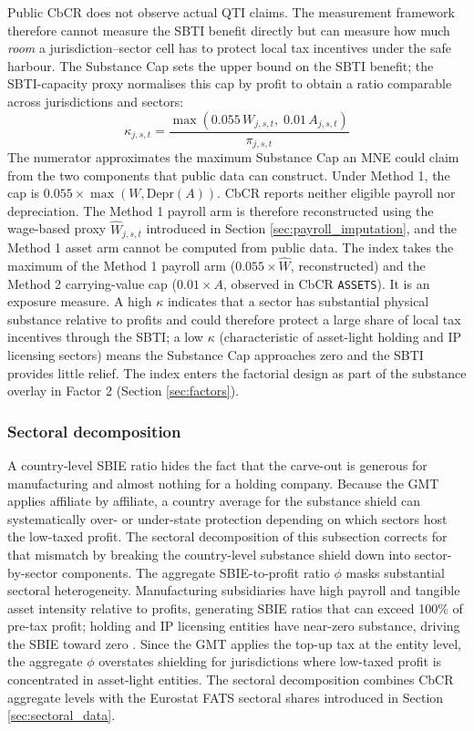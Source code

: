 \documentclass[11pt,a4paper]{article}
\newcommand{\code}[1]{\texttt{#1}}
\begin{document}
Public CbCR does not observe actual QTI claims. The measurement framework therefore cannot measure the SBTI benefit directly but can measure how much \emph{room} a jurisdiction--sector cell has to protect local tax incentives under the safe harbour. The Substance Cap sets the upper bound on the SBTI benefit; the SBTI-capacity proxy normalises this cap by profit to obtain a ratio comparable across jurisdictions and sectors:
\begin{equation}\label{eq:sbti_capacity}
\kappa_{j,s,t} = \frac{\max\!\left(0.055\,W_{j,s,t},\; 0.01\,A_{j,s,t}\right)}{\pi_{j,s,t}}
\end{equation}
The numerator approximates the maximum Substance Cap an MNE could claim from the two components that public data can construct. Under Method 1, the cap is $0.055 \times \max(W, \text{Depr}(A))$. CbCR reports neither eligible payroll nor depreciation. The Method 1 payroll arm is therefore reconstructed using the wage-based proxy $\hat{W}_{j,s,t}$ introduced in Section \ref{sec:payroll_imputation}, and the Method 1 asset arm cannot be computed from public data. The index takes the maximum of the Method 1 payroll arm ($0.055 \times \hat{W}$, reconstructed) and the Method 2 carrying-value cap ($0.01 \times A$, observed in CbCR \code{ASSETS}). It is an exposure measure. A high $\kappa$ indicates that a sector has substantial physical substance relative to profits and could therefore protect a large share of local tax incentives through the SBTI; a low $\kappa$ (characteristic of asset-light holding and IP licensing sectors) means the Substance Cap approaches zero and the SBTI provides little relief. The index enters the factorial design as part of the substance overlay in Factor 2 (Section \ref{sec:factors}).


\subsubsection{Sectoral decomposition}\label{sec:sbie_decomp}

A country-level SBIE ratio hides the fact that the carve-out is generous for manufacturing and almost nothing for a holding company. Because the GMT applies affiliate by affiliate, a country average for the substance shield can systematically over- or under-state protection depending on which sectors host the low-taxed profit. The sectoral decomposition of this subsection corrects for that mismatch by breaking the country-level substance shield down into sector-by-sector components. The aggregate SBIE-to-profit ratio $\phi$ masks substantial sectoral heterogeneity. Manufacturing subsidiaries have high payroll and tangible asset intensity relative to profits, generating SBIE ratios that can exceed 100\% of pre-tax profit; holding and IP licensing entities have near-zero substance, driving the SBIE toward zero \citep{devereux2023}. Since the GMT applies the top-up tax at the entity level, the aggregate $\phi$ overstates shielding for jurisdictions where low-taxed profit is concentrated in asset-light entities. The sectoral decomposition combines CbCR aggregate levels with the Eurostat FATS sectoral shares introduced in Section \ref{sec:sectoral_data}.
\end{document}
